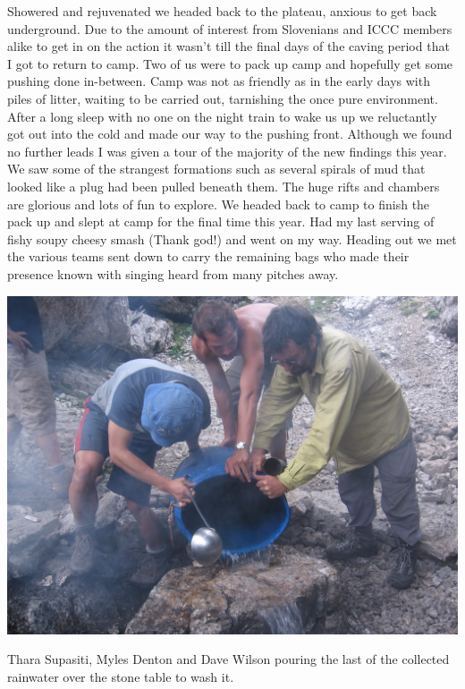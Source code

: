 Showered and rejuvenated we headed back to the plateau, anxious to get back underground. Due
to the amount of interest from Slovenians and ICCC members alike to get in on the action it wasn't
till the final days of the caving period that I got to return to camp. Two of us were to pack up camp
and hopefully get some pushing done in-between. Camp was not as friendly as in the early days with
piles of litter, waiting to be carried out, tarnishing the once pure environment. After a long sleep with
no one on the night train to wake us up we reluctantly got out into the cold and made our way to
the pushing front. 
Although we found no further leads I was given a tour of the majority of the new
findings this year. We saw some of the strangest formations such as several spirals of mud that looked
like a plug had been pulled beneath them. The huge rifts and chambers are glorious and lots of fun
to explore. We headed back to camp to finish the pack up and slept at camp for the final time this
year. Had my last serving of fishy soupy cheesy smash (Thank god!) and went on my way. Heading
out we met the various teams sent down to carry the remaining bags who made their presence known
with singing heard from many pitches away.



\begin{pagefigure}
\checkoddpage \ifoddpage \forcerectofloat \else \forceversofloat \fi
   \centering
\includegraphics[width = \textwidth]{2010/ap_awards/20100812-13-11-19 - Jarvist Frost A520 - IMG_0046--orig.jpg}
\caption{Thara Supasiti, Myles Denton and Dave Wilson pouring the last of the collected rainwater over the stone table to wash it. } \label{stone table wash}
\end{pagefigure}


